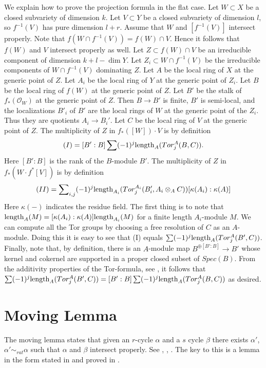 \medskip\noindent
We explain how to prove the projection formula in the flat case.
Let $W \subset X$ be a closed subvariety of dimension $k$.
Let $V \subset Y$ be a closed subvariety of dimension $l$,
so $f^{-1}(V)$ has pure dimension $l+r$.
Assume that $W$ and $[f^{-1}(V)]$ intersect properly. Note that
$f(W \cap f^{-1}(V)) = f(W) \cap V$. Hence it follows
that $f(W)$ and $V$ intersect properly as well. Let
$Z \subset f(W) \cap V$ be an irreducible component
of dimension $k+l-\dim Y$. Let $Z_i \subset W\cap f^{-1}(V)$
be the irreducible components of $W\cap f^{-1}(V)$
dominating $Z$.
Let $A$ be the local ring of $X$ at the generic point of $Z$.
Let $A_i$ be the local ring of $Y$ at the generic point of $Z_i$.
Let $B$ be the local ring of $f(W)$ at the generic point of $Z$.
Let $B'$ be the stalk of $f_*(\mathcal{O}_W)$ at the generic point
of $Z$. Then $B \to B'$ is finite, $B'$ is semi-local, and the
localizations $B'_i$ of $B'$ are the local rings of $W$ at the generic
point of the $Z_i$. Thus they are quotients $A_i \to B_i'$.
Let $C$ be the local ring of $V$ at the generic point of $Z$.
The multiplicity of $Z$ in $f_*([W])\cdot V$ is by definition
$$
(I) = [B' : B] \sum (-1)^j \hbox{length}_{A}(Tor^A_j(B,C)).
$$
Here $[B':B]$ is the rank of the $B$-module $B'$.
The multiplicity of $Z$ in $f_*( W \cdot f^*[V])$ is
by definition
$$
(II) = \sum\nolimits_{i,j} (-1)^j
\hbox{length}_{A_i}(Tor^{A_i}_j(B'_i, A_i\otimes_A C))
[\kappa(A_i):\kappa(A)]
$$
Here $\kappa(-)$ indicates the residue field.
The first thing is to note that
$\hbox{length}_A(M) = [\kappa(A_i):\kappa(A)]\hbox{length}_{A_i}(M)$
for a finite length $A_i$-module $M$.
We can compute all the Tor groups by choosing a free resolution
of $C$ as an $A$-module. Doing this it is easy to see that
(I) equals $\sum (-1)^j \hbox{length}_{A}(Tor^A_j(B', C))$.
Finally, note that, by definition, there is an $A$-module map
$B^{\oplus [B':B]} \to B'$ whose kernel and cokernel are
supported in a proper closed subset of $Spec(B)$. From the
additivity properties of the Tor-formula, see
\cite[Chapter V]{Serre_algebre_locale},
it follows that $\sum (-1)^j \hbox{length}_{A}(Tor^A_j(B', C)) =
[B':B] \sum (-1)^j \hbox{length}_{A}(Tor^A_j(B, C))$ as desired.


\section{Moving Lemma}
\label{section-moving-lemma}

\noindent
The moving lemma states that given an $r$-cycle $\alpha$ and a $s$ cycle
$\beta$ there exists $\alpha'$, $\alpha' \sim_{rat} \alpha$ such that
$\alpha$ and $\beta$ intersect properly.
See \cite{Samuel}, \cite{ChevalleyI}, \cite{ChevalleyII}.
The key to this is a lemma in the form stated in
\cite[Example 11.4.1]{F} and proved in \cite{Roberts}.

